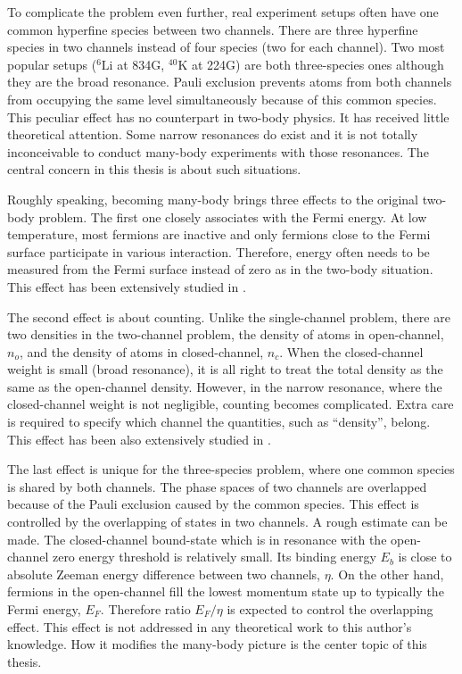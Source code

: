 To complicate the problem even further,  real experiment setups often have one common hyperfine species between two channels. There are three hyperfine species in two channels instead of four species (two for each channel).  Two most popular setups (${}^{6}\text{Li}$ at 834G, $^{40}\text{K}$ at 224G) are both three-species ones although they are the broad resonance.  Pauli exclusion prevents  atoms from both channels from occupying the same level simultaneously because of this common species.  This peculiar effect has no counterpart in two-body physics. It has  received little theoretical attention.    Some  narrow resonances do exist \cite{ChinRMP} and it is not totally inconceivable to conduct many-body experiments with those resonances.  The central concern in this thesis is about such situations. 

Roughly speaking, becoming many-body brings three effects to the original two-body problem.  The first one closely associates with the Fermi energy.  At low temperature, most fermions are inactive and only fermions close to the Fermi surface participate in various interaction. Therefore, energy often needs to be measured from the Fermi surface instead of zero as in the two-body situation.  This effect has been extensively studied in \cite{GurarieNarrow}.

The second effect is about counting. Unlike the single-channel problem, there are two densities in the two-channel problem, the density of atoms in open-channel, $n_{o}$, and the density of atoms in closed-channel, $n_{c}$. When the closed-channel weight is small (broad resonance), it is all right to treat the total density as the same as the open-channel density.  However, in the narrow resonance, where the closed-channel weight is not negligible, counting becomes complicated.  Extra care is required to specify which channel the  quantities, such as ``density'', belong.  This effect has been  also extensively studied in \cite{GurarieNarrow}.

The last effect is unique for the three-species problem, where one common species is shared by both channels.  The phase spaces of two channels are overlapped because of the Pauli exclusion caused by the common species. This effect is controlled by the overlapping of states in two channels. A rough estimate can be made.  The closed-channel bound-state which is in resonance with the open-channel zero energy threshold is relatively small.  Its binding energy $E_b$ is close to absolute Zeeman energy difference between two channels, $\eta$.  On the other hand, fermions in the open-channel fill the lowest  momentum state up to typically the Fermi energy, $E_F$.  Therefore ratio $E_F/\eta$ is expected to control the overlapping effect. This effect is not addressed in any theoretical work to this author's knowledge.  How it modifies the many-body picture is the center topic of this thesis. 

